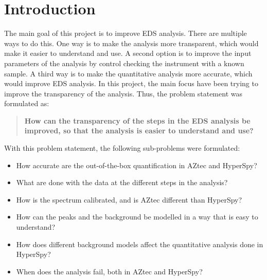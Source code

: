 \chapter{Introduction}
\label{chap:introduction}

%
%
The main goal of this project is to improve EDS analysis. There are multiple ways to do this.
One way is to make the analysis more transparent, which would make it easier to understand and use.
A second option is to improve the input parameters of the analysis by control checking the instrument with a known sample.
A third way is to make the quantitative analysis more accurate, which would improve EDS analysis.
In this project, the main focus have been trying to improve the transparency of the analysis. Thus, the problem statement was formulated as:

\begin{quote}
    \textbf{How can the transparency of the steps in the EDS analysis be improved, so that the analysis is easier to understand and use?
    }
\end{quote}


With this problem statement, the following sub-problems were formulated:

\begin{itemize}
    \item How accurate are the out-of-the-box quantification in AZtec and HyperSpy?
    \item What are done with the data at the different steps in the analysis?
    \item How is the spectrum calibrated, and is AZtec different than HyperSpy?
    \item How can the peaks and the background be modelled in a way that is easy to understand?
    \item How does different background models affect the quantitative analysis done in HyperSpy?
    \item When does the analysis fail, both in AZtec and HyperSpy?
\end{itemize}



%
%



